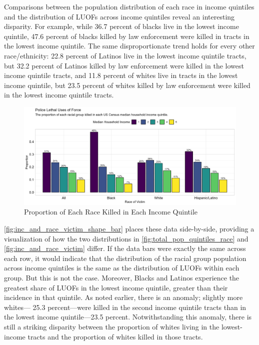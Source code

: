 \documentclass[12pt]{article}
\begin{document}
Comparisons between the population distribution of each race in income quintiles and the distribution of LUOFs across income quintiles reveal an interesting disparity. For example, while 36.7 percent of blacks live in the lowest income quintile, 47.6 percent of blacks killed by law enforcement were killed in tracts in the lowest income quintile. The same disproportionate trend holds for every other race/ethnicity: 22.8 percent of Latinos live in the lowest income quintile tracts, but 32.2 percent of Latinos killed by law enforcement were killed in the lowest income quintile tracts, and 11.8 percent of whites live in tracts in the lowest income quintile, but 23.5 percent of whites killed by law enforcement were killed in the lowest income quintile tracts.

\begin{figure}[H]
  \centering
  \includegraphics[width=\linewidth]{images/inc_and_race_victim}
  \captionsetup{justification=centering, singlelinecheck=false, margin=2cm}
  \caption{Proportion of Each Race Killed in Each Income Quintile}
  \label{fig:inc_and_race_victim}
\end{figure}
\autoref{fig:inc_and_race_victim_shape_bar} places these data side-by-side, providing a visualization of how the two
distributions in \autoref{fig:total_pop_quintiles_race} and \autoref{fig:inc_and_race_victim} differ. If the data bars were exactly the same across each row, it would indicate that the distribution of the racial group population across income quintiles is the same as the distribution of LUOFs within each group. But this is not the case. Moreover, Blacks and Latinos experience the greatest share of LUOFs in the lowest income quintile, greater than their incidence in that quintile. As noted earlier, there is an anomaly; slightly more whites— 25.3 percent—were killed in the second income quintile tracts than in the lowest income quintile—23.5 percent. Notwithstanding this anomaly, there is still a striking disparity between the proportion of whites living in the lowest-income tracts and the proportion of whites killed in those tracts.
\end{document}
